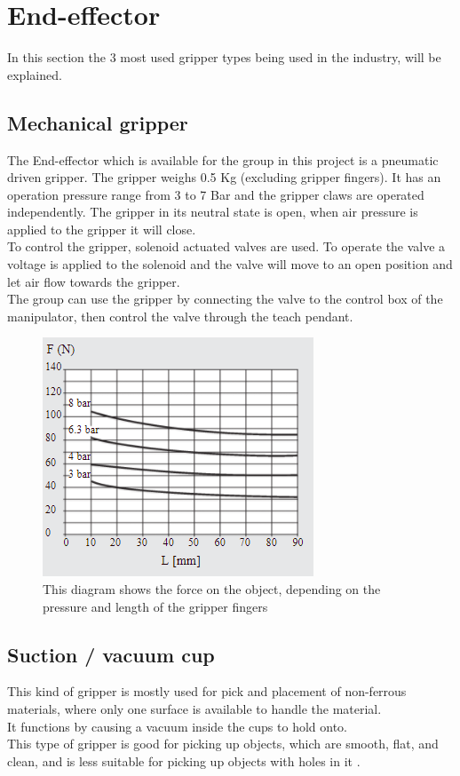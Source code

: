 \section{End-effector}

In this section the 3 most used gripper types being used in the industry, will be explained.

\subsection{Mechanical gripper}
The End-effector which is available for the group in this project is a pneumatic driven gripper. The gripper weighs 0.5 Kg (excluding gripper fingers). It has an operation pressure range from 3 to 7 Bar and the gripper claws are operated independently\cite{MWC}. The gripper in its neutral state is open, when air pressure is applied to the gripper it will close.\\
To control the gripper, solenoid actuated valves are used. To operate the valve a voltage is applied to the solenoid and the valve will move to an open position and let air flow towards the gripper.\\
The group can use the gripper by connecting the valve to the control box of the manipulator, then control the valve through the teach pendant.\\ 

\begin{figure}[H]
    \centering
    \includegraphics{TechnicalAnlysis/MWforcedia.PNG}
    \caption{This diagram shows the force on the object, depending on the pressure and length of the gripper fingers\cite{MWC}}
    \label{fig:Mvforce}
\end{figure}

\subsection{Suction / vacuum cup}
This kind of gripper is mostly used for pick and placement of non-ferrous materials, where only one surface is available to handle the material.\\ 
It functions by causing a vacuum inside the cups to hold onto.\\
This type of gripper is good for picking up objects, which are smooth, flat, and clean, and is less suitable for picking up objects with holes in it \cite{Gripper1}.\\


